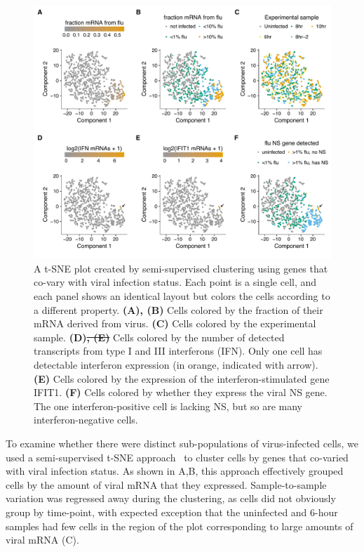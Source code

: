 \documentclass[9pt,lineno]{elife}
\providecommand{\DIFdel}[1]{{\protect\color{red}\sout{#1}}}                      %
\providecommand{\DIFdelFL}[1]{\DIFdel{#1}} %
\providecommand{\DIFaddbeginFL}{} %
\providecommand{\DIFaddendFL}{} %
\providecommand{\DIFdelbeginFL}{} %
\providecommand{\DIFdelendFL}{} %
\begin{document}
\begin{figure}
\DIFdelbeginFL %
\DIFdelendFL \DIFaddbeginFL \centerline{\includegraphics[width=0.9\linewidth]{figures/p_small_tsne_merge_manualedits.pdf}}
\DIFaddendFL \caption{\label{fig:tsne}
A t-SNE plot created by semi-supervised clustering using genes that co-vary with viral infection status.
Each point is a single cell, and each panel shows an identical layout but colors the cells according to a different property.
{\bf (A), (B)}
Cells colored by the fraction of their mRNA derived from virus.
{\bf (C)}
Cells colored by the experimental sample.
{\bf (D)\DIFdelbeginFL \DIFdelFL{, (E)}\DIFdelendFL }
Cells colored by the number of detected transcripts from type I and III interferons (IFN).
Only one cell has detectable interferon expression (in orange, indicated with arrow).
{\bf (E)}
Cells colored by the expression of the interferon-stimulated gene IFIT1.
{\bf (F)}
Cells colored by whether they express the viral NS gene.
The one interferon-positive cell is lacking NS, but so are many interferon-negative cells.
}
\end{figure}

To examine whether there were distinct sub-populations of virus-infected cells, we used a semi-supervised t-SNE approach~\citep{VanderMaaten:2008tm} to cluster cells by genes that co-varied with viral infection status.
As shown in A,B, this approach effectively grouped cells by the amount of viral mRNA that they expressed.
Sample-to-sample variation was regressed away during the clustering, as cells did not obviously group by time-point, with expected exception that the uninfected and 6-hour samples had few cells in the region of the plot corresponding to large amounts of viral mRNA (C).
\end{document}
